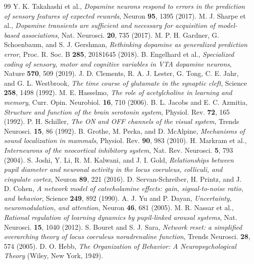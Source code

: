 \begin{thebibliography}{99}
 Y. K. Takahashi et al., \emph{Dopamine neurons respond to errors in the prediction of sensory features of expected rewards}, Neuron \textbf{95}, 1395 (2017).
 M. J. Sharpe et al., \emph{Dopamine transients are sufficient and necessary for acquisition of model-based associations}, Nat. Neurosci. \textbf{20}, 735 (2017).
 M. P. H. Gardner, G. Schoenbaum, and S. J. Gershman, \emph{Rethinking dopamine as generalized prediction error}, Proc. R. Soc. B \textbf{285}, 20181645 (2018).
 B. Engelhard et al., \emph{Specialized coding of sensory, motor and cognitive variables in VTA dopamine neurons}, Nature \textbf{570}, 509 (2019).
 J. D. Clements, R. A. J. Lester, G. Tong, C. E. Jahr, and G. L. Westbrook, \emph{The time course of glutamate in the synaptic cleft}, Science \textbf{258}, 1498 (1992).
 M. E. Hasselmo, \emph{The role of acetylcholine in learning and memory}, Curr. Opin. Neurobiol. \textbf{16}, 710 (2006).
 B. L. Jacobs and E. C. Azmitia, \emph{Structure and function of the brain serotonin system}, Physiol. Rev. \textbf{72}, 165 (1992).
 P. H. Schiller, \emph{The ON and OFF channels of the visual system}, Trends Neurosci. \textbf{15}, 86 (1992).
 B. Grothe, M. Pecka, and D. McAlpine, \emph{Mechanisms of sound localization in mammals}, Physiol. Rev. \textbf{90}, 983 (2010).
 H. Markram et al., \emph{Interneurons of the neocortical inhibitory system}, Nat. Rev. Neurosci. \textbf{5}, 793 (2004).
 S. Joshi, Y. Li, R. M. Kalwani, and J. I. Gold, \emph{Relationships between pupil diameter and neuronal activity in the locus coeruleus, colliculi, and cingulate cortex}, Neuron \textbf{89}, 221 (2016).
 D. Servan-Schreiber, H. Printz, and J. D. Cohen, \emph{A network model of catecholamine effects: gain, signal-to-noise ratio, and behavior}, Science \textbf{249}, 892 (1990).
 A. J. Yu and P. Dayan, \emph{Uncertainty, neuromodulation, and attention}, Neuron \textbf{46}, 681 (2005).
 M. R. Nassar et al., \emph{Rational regulation of learning dynamics by pupil-linked arousal systems}, Nat. Neurosci. \textbf{15}, 1040 (2012).
 S. Bouret and S. J. Sara, \emph{Network reset: a simplified overarching theory of locus coeruleus noradrenaline function}, Trends Neurosci. \textbf{28}, 574 (2005).
 D. O. Hebb, \emph{The Organization of Behavior: A Neuropsychological Theory} (Wiley, New York, 1949).

\end{thebibliography}
